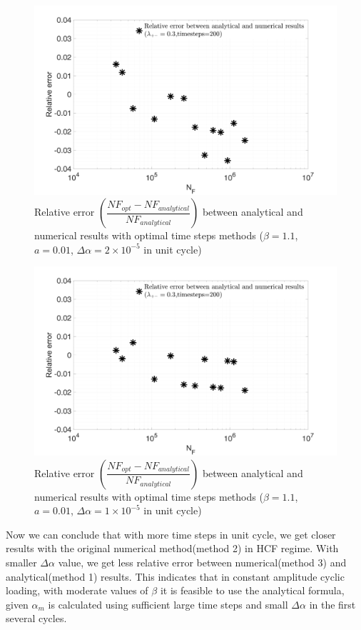 \documentclass[3p,times,procedia,number]{elsarticle}
\begin{document}
\begin{figure}[!h]
	\centering
	\includegraphics[width=\textwidth]{figures//SN_opt_ana_200_delta_alp=0.00002_err.png} 
	\caption{Relative error $\left( \dfrac{NF_{opt}-NF_{analytical}}{NF_{analytical}}\right)$  between analytical and numerical results with optimal time steps methods ($\beta=1.1$, $a=0.01$, $\Delta \alpha=2\times10^{-5}$ in unit cycle)}	
	\label{fig.errorNumAna0.02}
\end{figure}
\begin{figure}[!h]
	\centering
	\includegraphics[width=\textwidth]{figures//SN_opt_ana_200_delta_alp=0.00001_err.png} 
	\caption{Relative error $\left(\dfrac{NF_{opt}-NF_{analytical}}{NF_{analytical}}\right)$  between analytical and numerical results with optimal time steps methods ($\beta=1.1$, $a=0.01$, $\Delta \alpha=1\times10^{-5}$ in unit cycle)}
	\label{fig.errorNumAna0.01}
\end{figure}

Now we can conclude that with more time steps in unit cycle, we get closer results with the original numerical method(method 2) in HCF regime. With smaller $\Delta \alpha$ value, we get less relative error between numerical(method 3) and analytical(method 1) results. This indicates that in constant amplitude cyclic loading, with moderate values of $\beta$ it is feasible to use the analytical formula, given $\alpha_m$ is calculated using sufficient large time steps and small $\Delta \alpha$ in the first several cycles.
\end{document}
